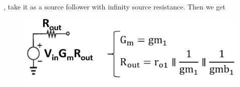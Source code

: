 \documentclass{beamer}
\begin{document}
\begin{frame}
\begin{minipage}{0.55\linewidth}
\begin{minipage}{0.26\linewidth}
\begin{figure}[H]
            \end{figure}
        \end{minipage}
        , take it as a source follower with infinity source resistance. Then we get 
            \begin{figure}[H]
                \centering
                \includegraphics[width=0.9\linewidth]{source-follower3}
            \end{figure}
    \end{minipage}\\
\end{frame}
\end{document}
